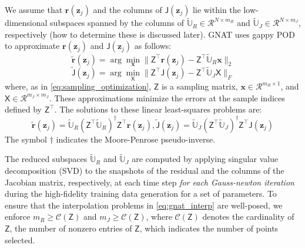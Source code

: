 \documentclass[11pt]{article}
\renewcommand{\vec}[1]{\mathbf{#1}}
\newcommand{\mat}[1]{\mathsf{#1}}
\begin{document}
We assume that $ \vec{r}(\vec{z}_j)$ and the columns of ${\mat{J}}(\vec{z}_j)$ lie within the low-dimensional subspaces spanned by the columns of $ \widetilde{\mathbb{U}}_R \in \mathcal{R}^{N \times m_{R}} $ and $\widetilde{\mathbb{U}}_J \in \mathcal{R}^{N \times m_{J}}$, respectively (how to determine these is discussed later).
GNAT uses gappy POD to approximate $ \vec{r}(\vec{z}_j)$ and ${\mat{J}}(\vec{z}_j)$ as follows:
\begin{equation}
\widetilde{\vec{r}}(\vec{z}_j) = \arg\min_{\vec{x}} \| \mat{Z}^\top \vec{r}(\vec{z}_j) - \mat{Z}^\top \widetilde{\mathbb{U}}_R \vec{x} \|_2
\end{equation}
\begin{equation}
\widetilde{\mat{J}}(\vec{z}_j) = \arg\min_{\mat{X}} \| \mat{Z}^\top {\mat{J}}(\vec{z}_j) - \mat{Z}^\top \widetilde{\mathbb{U}}_J \mat{X} \|_F
\end{equation}
where, as in \cref{eq:sampling_optimization}, $\mat{Z}$ is a sampling matrix, $\vec{x} \in \mathcal{R}^{m_{R} \times 1}$, and $\mat{X} \in \mathcal{R}^{m_{J} \times m_{J}}$.
These approximations minimize the errors at the sample indices defined by $\mat{Z}^\top$.
The solutions to these linear least-squares problems are:
\begin{subequations}
\begin{equation}
\widetilde{\vec{r}}(\vec{z}_j) = \widetilde{\mathbb{U}}_R \left(\mat{Z}^\top \widetilde{\mathbb{U}}_R\right)^\dagger \mat{Z}^\top{\vec{r}}(\vec{z}_j),
\end{equation}
\begin{equation}
\widetilde{\mat{J}}(\vec{z}_j) = \widetilde{\mathbb{U}}_J \left(\mat{Z}^\top \widetilde{\mathbb{U}}_J\right)^\dagger \mat{Z}^\top{\mat{J}}(\vec{z}_j)
\end{equation}
\label{eq:gnat_interp}
\end{subequations}
The symbol $\dagger$ indicates the Moore-Penrose pseudo-inverse.


The reduced subspaces $\widetilde{\mathbb{U}}_R$ and $\widetilde{\mathbb{U}}_J$ are computed by applying singular value decomposition (SVD) to the snapshots of the residual and the columns of the Jacobian matrix, respectively, at each time step \textit{for each Gauss-newton iteration} during the high-fidelity training data generation for a set of parameters.
To ensure that the interpolation problems in \cref{eq:gnat_interp} are well-posed, we enforce $m_{R} \geq \mathcal{C}(\mat{Z})$ and $m_{J} \geq \mathcal{C}(\mat{Z})$, where $\mathcal{C}(\mat{Z})$ denotes the cardinality of $\mat{Z}$, the number of nonzero entries of $\mat{Z}$, which indicates the number of points selected.
\end{document}
